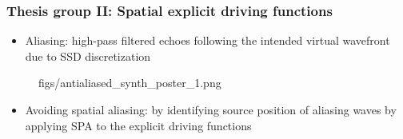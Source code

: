 \documentclass{beamer}
\begin{document}
\begin{frame}
\frametitle{Thesis group II: Spatial explicit driving functions}
\begin{itemize}
\item Aliasing: high-pass filtered echoes following the intended virtual wavefront due to SSD discretization
\end{itemize}
	\vspace{-3.5mm}	
	\begin{figure}
	\centering
	\begin{overpic}[width = 0.65\columnwidth ]{figs/antialiased_synth_poster_1.png}
	\end{overpic}
	\end{figure} 
	\vspace{-7mm}
		\begin{itemize}
		\item Avoiding spatial aliasing: by identifying source position of aliasing waves by applying SPA to the explicit driving functions
		\end{itemize}
\end{frame}
\end{document}
